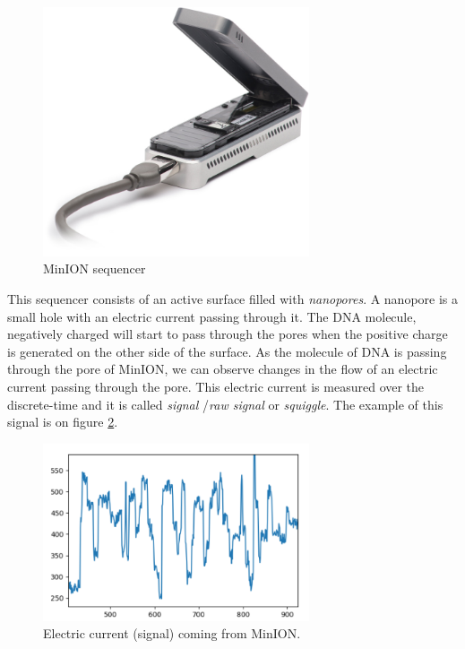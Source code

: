\begin{figure}
\centerline{\includegraphics[width=0.7\textwidth, height=0.3\textheight]{images/minion}}
\caption[MinION]{MinION sequencer}
\label{obr:minIon}
\end{figure}

This sequencer consists of an active surface filled with \textit{nanopores}. A nanopore
is a small hole with an electric current passing through it. The DNA molecule, negatively charged
will start to pass through the pores when the positive charge is generated on the
other side of the surface. As the molecule of DNA is passing through the pore of
MinION, we can observe changes in the flow of an electric current passing through the pore.
This electric current is measured over the discrete-time and it is called \textit{signal}
/\textit{raw signal} or \textit{squiggle}. The example of this signal is on figure \ref{obr:minIonCurrent}.

\begin{figure}
\centerline{\includegraphics[width=0.7\textwidth, height=0.3\textheight]{images/signal}}
\caption[MinION signal]{Electric current (signal) coming from MinION.}
\label{obr:minIonCurrent}
\end{figure}

